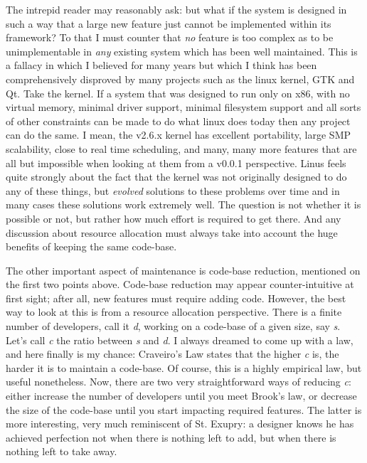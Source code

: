 \documentclass{book}
\begin{document}
The intrepid reader may reasonably ask: but what if the system is
designed in such a way that a large new feature just cannot be
implemented within its framework? To that I must counter that
\emph{no} feature is too complex as to be unimplementable in
\emph{any} existing system which has been well maintained. This is a
fallacy in which I believed for many years but which I think has been
comprehensively disproved by many projects such as the linux kernel,
GTK and Qt. Take the kernel. If a system that was designed to run only
on x86, with no virtual memory, minimal driver support, minimal
filesystem support and all sorts of other constraints can be made to
do what linux does today then any project can do the same. I mean, the
v2.6.x kernel has excellent portability, large SMP scalability, close
to real time scheduling, and many, many more features that are all but
impossible when looking at them from a v0.0.1 perspective. Linus feels
quite strongly about the fact that the kernel was not originally
designed to do any of these things, but \emph{evolved} solutions to
these problems over time and in many cases these solutions work
extremely well. The question is not whether it is possible or not, but
rather how much effort is required to get there. And any discussion
about resource allocation must always take into account the huge
benefits of keeping the same code-base.

The other important aspect of maintenance is code-base reduction,
mentioned on the first two points above. Code-base reduction may
appear counter-intuitive at first sight; after all, new features must
require adding code. However, the best way to look at this is from a
resource allocation perspective. There is a finite number of
developers, call it \emph{d}, working on a code-base of a given size,
say \emph{s}. Let's call \emph{c} the ratio between \emph{s} and
\emph{d}. I always dreamed to come up with a law, and here finally is
my chance: Craveiro's Law states that the higher \emph{c} is, the
harder it is to maintain a code-base. Of course, this is a highly
empirical law, but useful nonetheless. Now, there are two very
straightforward ways of reducing \emph{c}: either increase the number
of developers until you meet Brook's law, or decrease the size of the
code-base until you start impacting required features. The latter is
more interesting, very much reminiscent of St. Exupry: a designer
knows he has achieved perfection not when there is nothing left to
add, but when there is nothing left to take away.
\end{document}

